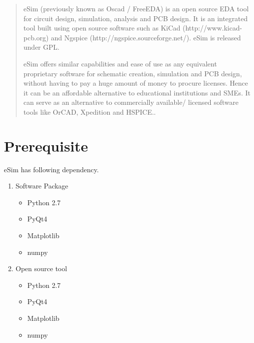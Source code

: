 \documentclass[12pt]{article}
\begin{document}
\begin{abstract}
eSim (previously known as Oscad / FreeEDA) is an open source EDA tool for circuit design, simulation, analysis and PCB design. It is an integrated tool built using open source software such as KiCad (http://www.kicad-pcb.org) and Ngspice (http://ngspice.sourceforge.net/). eSim is released under GPL.

eSim offers similar capabilities and ease of use as any equivalent proprietary software for schematic creation, simulation and PCB design, without having to pay a huge amount of money to procure licenses. Hence it can be an affordable alternative to educational institutions and SMEs. It can serve as an alternative to commercially available/ licensed software tools like OrCAD, Xpedition and HSPICE..
\end{abstract}

\newpage

\section{Prerequisite}

eSim has following dependency. 

\begin{enumerate}
	\item Software Package
		\begin{itemize}
			\item Python 2.7
			\item PyQt4
			\item Matplotlib
			\item numpy
		\end{itemize}

	\item Open source tool
		\begin{itemize}
			\item Python 2.7
			\item PyQt4
			\item Matplotlib
			\item numpy
		\end{itemize}
\end{enumerate}

\end{document}
